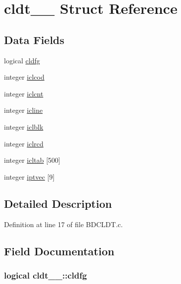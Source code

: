 \hypertarget{structcldt__1__}{}\section{cldt\+\_\+\_\+ Struct Reference}
\label{structcldt__1__}
\subsection*{Data Fields}
\begin{DoxyCompactItemize}
\item 
logical \hyperlink{structcldt__1___a9225486d98312a03a1adc5d32538d854}{cldfg}
\item 
integer \hyperlink{structcldt__1___a83e91f0eb72a8f7f252200e579e8ff91}{iclcod}
\item 
integer \hyperlink{structcldt__1___af51524b57aae104a023621870795580d}{iclcnt}
\item 
integer \hyperlink{structcldt__1___aa24a2d5c5059dbe5454464958a4679e6}{icline}
\item 
integer \hyperlink{structcldt__1___ac770c553974e437c422c04f5eb9a551b}{iclblk}
\item 
integer \hyperlink{structcldt__1___a8fa4f1bcde37d4a835394ec4df07414f}{iclrcd}
\item 
integer \hyperlink{structcldt__1___a1ae46bd299befeb5f881ab8079d6ba0c}{icltab} \mbox{[}500\mbox{]}
\item 
integer \hyperlink{structcldt__1___a4eac722ad6d6f20a1ae40c9fa5d06175}{iptvec} \mbox{[}9\mbox{]}
\end{DoxyCompactItemize}


\subsection{Detailed Description}


Definition at line 17 of file B\+D\+C\+L\+D\+T.\+c.



\subsection{Field Documentation}
\subsubsection[{\texorpdfstring{cldfg}{cldfg}}]{\setlength{\rightskip}{0pt plus 5cm}logical cldt\+\_\+\_\+\+::cldfg}\hypertarget{structcldt__1___a9225486d98312a03a1adc5d32538d854}{}\label{structcldt__1___a9225486d98312a03a1adc5d32538d854}



